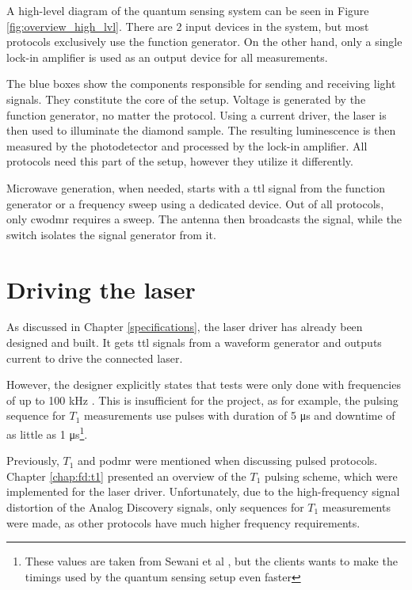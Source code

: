 A high-level diagram of the quantum sensing system can be seen in Figure \ref{fig:overview_high_lvl}. There are 2 input devices in the system, but most protocols exclusively use the function generator. On the other hand, only a single lock-in amplifier is used as an output device for all measurements. 

The blue boxes show the components responsible for sending and receiving light signals. They constitute the core of the setup. Voltage is generated by the function generator, no matter the protocol. Using a current driver, the laser is then used to illuminate the diamond sample. The resulting luminescence is then measured by the photodetector and processed by the lock-in amplifier. All protocols need this part of the setup, however they utilize it differently.

Microwave generation, when needed, starts with a \gls{ttl} signal from the function generator or a frequency sweep using a dedicated device. Out of all protocols, only \gls{cwodmr} requires a sweep. The antenna then broadcasts the signal, while the switch isolates the signal generator from it. 


\section{Driving the laser} \label{chap:fd:laser_driver}
As discussed in Chapter \ref{specifications}, the laser driver has already been designed and built. It gets \gls{ttl} signals from a waveform generator and outputs current to drive the connected laser.

However, the designer explicitly states that tests were only done with frequencies of up to 100 \unit{\kilo\hertz} \cite{sitnic2023}. This is insufficient for the project, as for example, the pulsing sequence for $T_1$ measurements use pulses with duration of 5 \unit{\micro\second} and downtime of as little as 1 \unit{\micro\second}\footnote{These values are taken from Sewani et al \cite{sewani2020coherent}, but the clients wants to make the timings used by the quantum sensing setup even faster}.

Previously, $T_1$ and \gls{podmr} were mentioned when discussing pulsed protocols. Chapter \ref{chap:fd:t1} presented an overview of the $T_1$ pulsing scheme, which were implemented for the laser driver. Unfortunately, due to the high-frequency signal distortion of the Analog Discovery signals, only sequences for $T_1$ measurements were made, as other protocols have much higher frequency requirements.

